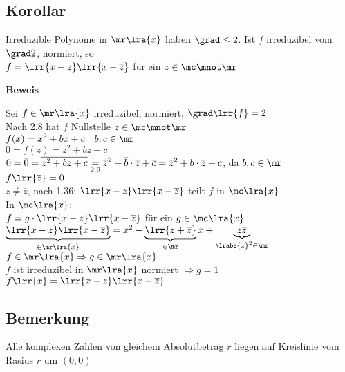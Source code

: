 \subsection{Korollar}
	Irreduzible Polynome in $\mr\lra{x}$ haben $\grad\leq 2$. Ist $f$ irreduzibel vom $\grad 2$, normiert, so \\
	$f=\lrr{x-z}\lrr{x-\overline{z}}$ für ein $z\in\mc\mnot\mr$
	
	\textbf{Beweis}
	
	Sei $f\in\mr\lra{x}$ irreduzibel, normiert, $\grad\lrr{f}=2$\\
	Nach 2.8 hat $f$ Nullstelle $z\in\mc\mnot\mr$\\
	$f(x)=x^2+bx+c\quad b,c\in\mr$\\
	$0=f(z)=z^2+bz+c$\\
	$0=\overline{0}=\overline{z^2+bz+c} \underset{\mbox{\scriptsize 2.6}}{=}\overline{z}^2+\overline{b}\cdot\overline{z}+\overline{c}=\overline{z}^2+b\cdot\overline{z}+c$, da $b,c\in\mr$\\
	$f\lrr{\overline{z}}=0$\\
	$z\neq\overline{z}$, nach 1.36: $\lrr{x-z}\lrr{x-\overline{z}}$ teilt $f$ in $\mc\lra{x}$\\
	In $\mc\lra{x}$:\\
	$f=g\cdot\lrr{x-z}\lrr{x-\overline{z}}$ für ein $g\in\mc\lra{x}$\\
	$\underbrace{\lrr{x-z}\lrr{x-\overline{z}}}_{\in\mr\lra{x}}=x^2-\underbrace{\lrr{z+\overline{z}}}_{\in\mr}x+\underbrace{z\overline{z}}_{\scriptstyle \lrabs{z}^2\in\mr}$\\
	$f\in\mr\lra{x}\Rightarrow g\in\mr\lra{x}$\\
	$f$ ist irreduzibel in $\mr\lra{x}$ normiert $\Rightarrow g=1$\\
	$f\lrr{x}=\lrr{x-z}\lrr{x-\overline{z}}$

\subsection{Bemerkung}
		\item Alle komplexen Zahlen von gleichem Absolutbetrag $r$ liegen auf Kreislinie vom Rasius $r$ um $(0,0)$
		
			
